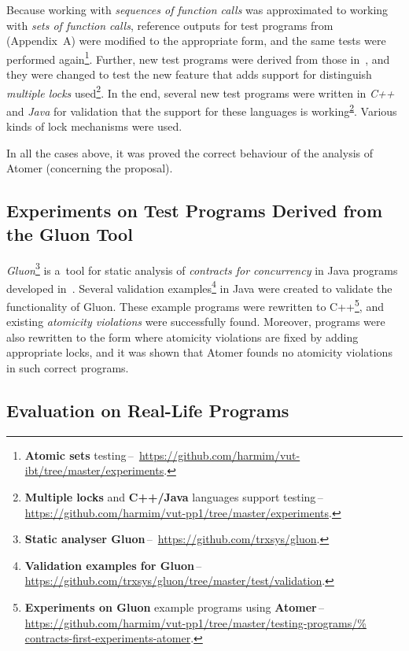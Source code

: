 Because working with \emph{sequences of function calls} was approximated to
working with \emph{sets of function calls}, reference outputs for test programs
from~\cite{harmimBP} (Appendix~A) were modified to the appropriate form, and the
same tests were performed again\footnote{\textbf{Atomic sets} testing\,--\,%
\url{https://github.com/harmim/vut-ibt/tree/master/experiments}.}. Further,
new test programs were derived from those in~\cite{harmimBP}, and they were
changed to test the new feature that adds support for distinguish \emph{multiple
locks} used\footnote{\label{fn:test2}\textbf{Multiple locks} and
\textbf{C++/Java} languages support testing\,--\,%
\url{https://github.com/harmim/vut-pp1/tree/master/experiments}.}. In the end,
several new test programs were written in \emph{C++} and \emph{Java}
for validation that the support for these languages is
working\textsuperscript{\ref{fn:test2}}. Various kinds of lock mechanisms were
used.

In all the cases above, it was proved the correct behaviour of the analysis
of Atomer (concerning the proposal).

\subsection{Experiments on Test Programs Derived from the Gluon Tool}
\label{sec:expGluon}

\emph{Gluon}\footnote{\textbf{Static analyser Gluon}\,--\,%
\url{https://github.com/trxsys/gluon}.} is a~tool for static analysis of
\emph{contracts for concurrency} in Java programs developed
in~\cite{contracts2015, contracts2017}. Several validation examples\footnote{%
\textbf{Validation examples for Gluon}\,--\,%
\url{https://github.com/trxsys/gluon/tree/master/test/validation}.} in Java
were created to validate the functionality of Gluon. These example programs were
rewritten to C++\footnote{\textbf{Experiments on Gluon} example programs using
\textbf{Atomer}\,--\,%
\url{https://github.com/harmim/vut-pp1/tree/master/testing-programs/%
contracts-first-experiments-atomer}.}, and existing \emph{atomicity violations}
were successfully found. Moreover, programs were also rewritten to the form
where atomicity violations are fixed by adding appropriate locks, and it was
shown that Atomer founds no atomicity violations in such correct programs.

\subsection{Evaluation on Real-Life Programs}
\label{sec:expReal}

